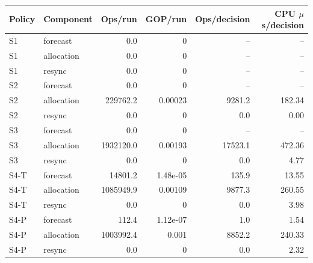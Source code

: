 \begin{tabular}{llrrrr}\toprule
Policy & Component & Ops/run & GOP/run & Ops/decision & CPU $\mu$s/decision\\\midrule
S1 & forecast & 0.0 & 0 & -- & --\\
S1 & allocation & 0.0 & 0 & -- & --\\
S1 & resync & 0.0 & 0 & -- & --\\
S2 & forecast & 0.0 & 0 & -- & --\\
S2 & allocation & 229762.2 & 0.00023 & 9281.2 & 182.34\\
S2 & resync & 0.0 & 0 & 0.0 & 0.00\\
S3 & forecast & 0.0 & 0 & -- & --\\
S3 & allocation & 1932120.0 & 0.00193 & 17523.1 & 472.36\\
S3 & resync & 0.0 & 0 & 0.0 & 4.77\\
S4-T & forecast & 14801.2 & 1.48e-05 & 135.9 & 13.55\\
S4-T & allocation & 1085949.9 & 0.00109 & 9877.3 & 260.55\\
S4-T & resync & 0.0 & 0 & 0.0 & 3.98\\
S4-P & forecast & 112.4 & 1.12e-07 & 1.0 & 1.54\\
S4-P & allocation & 1003992.4 & 0.001 & 8852.2 & 240.33\\
S4-P & resync & 0.0 & 0 & 0.0 & 2.32\\
\bottomrule\end{tabular}

